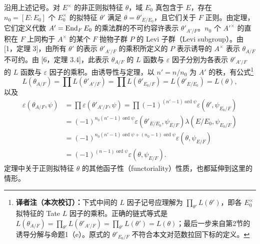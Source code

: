 沿用上述记号。对 $E^\times$ 的非正则拟特征 $\theta$，域 $E_0$ 真包含于 $E$，存在 $n_0=[E:E_0]$ 个 $E_0^\times$ 的拟特征 $\theta'$ 满足 $\theta=\theta'_{E/E_0}$，且它们关于 $F$ 正则。由定理，它们定义代数 $A'=\operatorname{End}_FE_0$ 的乘法群的不可约容许表示 $\theta'_{A'/F}$。$n_0$ 个 $A'^\times$ 的直积在 $F$ 上同构于 $A^\times$ 的某个 $F$ 抛物子群 $P$ 的 Levi 子群（Levi subgroup）。由 [1，定理 3]，由所有 $\theta'$ 的表示 $\theta'_{A'/F}$ 的乘积所定义的 $P$ 表示诱导的 $A^\times$ 表示 $\theta_{A/F}$ 不可约。由 [6，定理 3.4]，此表示 $\theta_{A/F}$ 的 $L$ 函数与 $\varepsilon$ 因子分别为各表示 $\theta'_{A'/F}$ 的 $L$ 函数与 $\varepsilon$ 因子的乘积。由诱导性与定理，以 $n'=n/n_0$ 为 $A'$ 的秩，有公式\footnote{\textbf{译者注（本次校订）：}下式中间的 $L$ 因子记号应理解为 $\prod_{\theta'}L(\theta')$，即各 $E_0^\times$ 拟特征的 Tate $L$ 因子的乘积。正确的链式等式是 $L(\theta_{A/F})=\prod_{\theta'}L(\theta'_{A'/F})=\prod_{\theta'}L(\theta')=L(\theta)$；最后一步来自第2节的诱导分解与命题1（e）。原式的 $\theta'_{E_0/F}$ 不符合本文对范数拉回下标的定义。}
\[
L(\theta_{A/F})=\prod L(\theta'_{A'/F})=\prod L(\theta'_{E_0/F})=L(\theta'_{E/E_0})=L(\theta),
\]
以及
\[
\begin{aligned}
\varepsilon(\theta_{A/F},\psi)
&=\prod\varepsilon(\theta'_{A'/F},\psi)
=\prod(-1)^{(n'-1)\operatorname{ord}\psi}\varepsilon(\theta',\psi_{E_0/F})\\
&=(-1)^{n_0(n'-1)\operatorname{ord}\psi}
\varepsilon(\theta'_{E/E_0},\psi_{E/F})\lambda(E/E_0,\psi_{E_0/F})\\
&=(-1)^{n_0(n'-1)\operatorname{ord}\psi+(n_0-1)\operatorname{ord}\psi}
\varepsilon(\theta,\psi_{E/F})\\
&=(-1)^{(n-1)\operatorname{ord}\psi}\varepsilon(\theta,\psi_{E/F}).
\end{aligned}
\]
定理中关于正则拟特征 $\theta$ 的其他函子性（functoriality）性质，也都延伸到这里的情形。

